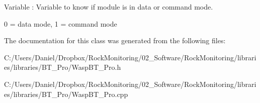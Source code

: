 Variable \+: Variable to know if module is in data or command mode. 

0 = data mode, 1 = command mode 

The documentation for this class was generated from the following files\+:\begin{DoxyCompactItemize}
\item 
C\+:/\+Users/\+Daniel/\+Dropbox/\+Rock\+Monitoring/02\+\_\+\+Software/\+Rock\+Monitoring/libraries/libraries/\+B\+T\+\_\+\+Pro/Wasp\+B\+T\+\_\+\+Pro.\+h\item 
C\+:/\+Users/\+Daniel/\+Dropbox/\+Rock\+Monitoring/02\+\_\+\+Software/\+Rock\+Monitoring/libraries/libraries/\+B\+T\+\_\+\+Pro/Wasp\+B\+T\+\_\+\+Pro.\+cpp\end{DoxyCompactItemize}
